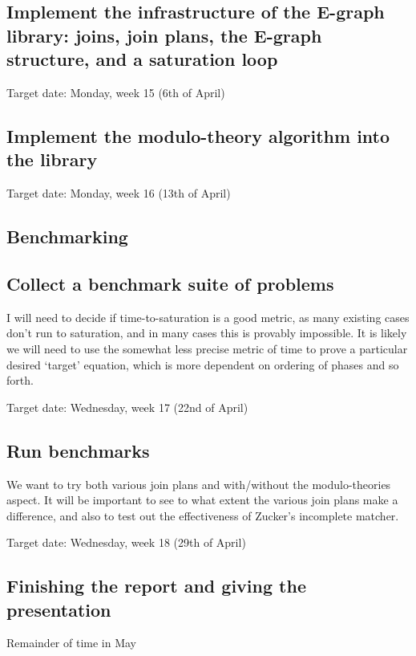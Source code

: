 \documentclass{article}
\theoremstyle{definition}
\begin{document}
\subsection{Implement the infrastructure of the E-graph library: joins, join plans, the E-graph structure, and a saturation loop}
Target date: Monday, week 15 (6th of April)

\subsection{Implement the modulo-theory algorithm into the library}
Target date: Monday, week 16 (13th of April)

\subsection{Benchmarking}
\subsection{Collect a benchmark suite of problems}
I will need to decide if time-to-saturation is a good metric, as many existing cases don't run to saturation, and in many cases this is provably impossible. It is likely we will need to use the somewhat less precise metric of time to prove a particular desired `target' equation, which is more dependent on ordering of phases and so forth.

Target date: Wednesday, week 17 (22nd of April)

\subsection{Run benchmarks}
We want to try both various join plans and with/without the modulo-theories aspect. It will be important to see to what extent the various join plans make a difference, and also to test out the effectiveness of Zucker's incomplete matcher.

Target date: Wednesday, week 18 (29th of April)

\subsection{Finishing the report and giving the presentation}
Remainder of time in May
\end{document}
